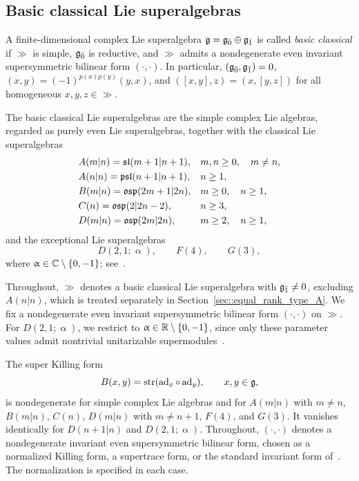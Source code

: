 \subsection{Basic classical Lie superalgebras}

A finite-dimensional complex Lie superalgebra ${\mathfrak{g}}={\mathfrak{g}_{\bar{0}}}\oplus{\mathfrak{g}_{\bar{1}}}$ is called \emph{basic classical} if $\gg$ is simple, ${\mathfrak{g}_{\bar{0}}}$ is reductive, and $\gg$ admits a nondegenerate even invariant supersymmetric bilinear form $(\cdot,\cdot)$. In particular,
$
({\mathfrak{g}_{\bar{0}}},{\mathfrak{g}_{\bar{1}}})=0
$, $(x,y)=(-1)^{p(x)p(y)}(y,x)$,
and
$
([x,y],z)=(x,[y,z])
$
for all homogeneous $x,y,z\in\gg$.

The basic classical Lie superalgebras are the simple complex Lie algebras, regarded as purely even Lie superalgebras, together with the classical Lie superalgebras
\begin{equation}
\begin{aligned}
&A(m\vert n)={\mathfrak{sl}}(m+1\vert n+1), && m,n\geq0,\quad m\neq n,\\
&A(n\vert n)={\mathfrak{psl}}(n+1\vert n+1), && n\geq1,\\
&B(m\vert n)={\mathfrak{osp}}(2m+1\vert2n), && m\geq0,\quad n\geq1,\\
&C(n)={\mathfrak{osp}}(2\vert2n-2), && n\geq3,\\
&D(m\vert n)={\mathfrak{osp}}(2m\vert2n), && m\geq2,\quad n\geq1,
\end{aligned}
\end{equation}
and the exceptional Lie superalgebras
\begin{equation}
D(2,1;\upalpha),\qquad F(4),\qquad G(3),
\end{equation}
where $\upalpha\in{\mathbb C}\setminus\{0,-1\}$; see~\cite{Kac}.  

Throughout, $\gg$ denotes a basic classical Lie superalgebra with ${\mathfrak{g}_{\bar{1}}}\neq0$, excluding $A(n\vert n)$, which is treated separately in Section~\ref{sec::equal_rank_type_A}. We fix a nondegenerate even invariant supersymmetric bilinear form $(\cdot,\cdot)$ on $\gg$. For $D(2,1;\upalpha)$, we restrict to $\upalpha\in{\mathbb R}\setminus\{0,-1\}$, since only these parameter values admit nontrivial unitarizable supermodules~\cite{neeb2011lie}.


The super Killing form
\begin{equation}
B(x,y)=\operatorname{str}(\operatorname{ad}_x\circ\operatorname{ad}_y),
\qquad x,y\in{\mathfrak{g}},
\label{eq::super_Killing_form}
\end{equation}
is nondegenerate for simple complex Lie algebras and for $A(m\vert n)$ with $m\neq n$, $B(m\vert n)$, $C(n)$, $D(m\vert n)$ with $m\neq n+1$, $F(4)$, and $G(3)$. It vanishes identically for $D(n+1\vert n)$ and $D(2,1;\upalpha)$. Throughout, $(\cdot,\cdot)$ denotes a nondegenerate invariant even supersymmetric bilinear form, chosen as a normalized Killing form, a supertrace form, or the standard invariant form of~\cite[Section~5.4]{musson2012lie}. The normalization is specified in each case.



